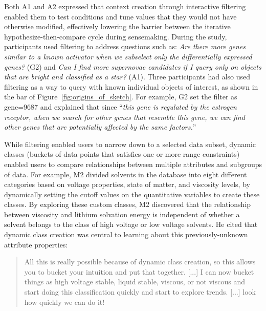  \par Both A1 and A2 expressed that context creation through interactive filtering enabled them to test conditions and tune values that they would not have otherwise modified, effectively lowering the barrier between the iterative hypothesize-then-compare cycle during sensemaking.
 During the study, participants used filtering
 to address questions such as:
 \textit{Are there more genes similar
 to a known activator when we subselect
 only the differentially expressed genes?} (G2) and \textit{Can I find more supernovae candidates if I query only on objects that are bright and classified as a star?} (A1). Three participants had also used filtering as a way to query with known individual objects of interest, as shown in the  bar of Figure~\ref{fig:origins_of_sketch}. For example, G2 set the filter as gene=9687 and explained that since ``\textit{this gene is regulated by the estrogen receptor, when we search for other genes that resemble this gene, we can find other genes that are potentially affected by the same factors.}''
 \par While filtering enabled users to
 narrow down to a selected data subset,
 dynamic classes (buckets of data points that satisfies one or more range constraints) enabled users to compare
 relationships between multiple attributes and subgroups of data.
 For example, M2 divided solvents in the database
 into eight different categories based on voltage properties,
 state of matter, and viscosity levels,
 by dynamically setting the cutoff values
 on the quantitative variables to create these classes.
 By exploring these custom classes, M2 discovered that the relationship between viscosity and lithium solvation energy is independent of whether a solvent belongs to the class of high voltage or low voltage solvents. He cited that dynamic class creation was central to learning about this previously-unknown attribute properties:
 \begin{quote}
 All this is really possible because of dynamic class creation, so this allows you to bucket your intuition and put that together. [...] I can now bucket things as high voltage stable, liquid stable, viscous, or not viscous and start doing this classification quickly and start to explore trends. [...] look how quickly we can do it!%
 \end{quote}
